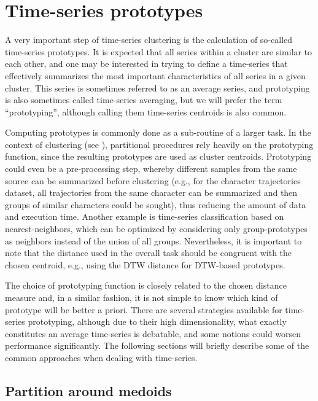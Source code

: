 \section{Time-series prototypes}
\label{sec:prototypes}

A very important step of time-series clustering is the calculation of so-called time-series prototypes.
It is expected that all series within a cluster are similar to each other,
and one may be interested in trying to define a time-series that effectively summarizes the most important characteristics of all series in a given cluster.
This series is sometimes referred to as an average series,
and prototyping is also sometimes called time-series averaging,
but we will prefer the term ``prototyping'',
although calling them time-series centroids is also common.

Computing prototypes is commonly done as a sub-routine of a larger task.
In the context of clustering (see ),
partitional procedures rely heavily on the prototyping function,
since the resulting prototypes are used as cluster centroids.
Prototyping could even be a pre-processing step,
whereby different samples from the same source can be summarized before clustering
(e.g., for the character trajectories dataset,
all trajectories from the same character can be summarized and then groups of similar characters could be sought),
thus reducing the amount of data and execution time.
Another example is time-series classification based on nearest-neighbors,
which can be optimized by considering only group-prototypes as neighbors instead of the union of all groups.
Nevertheless, it is important to note that the distance used in the overall task should be congruent with the chosen centroid,
e.g., using the DTW distance for DTW-based prototypes.

The choice of prototyping function is closely related to the chosen distance measure and,
in a similar fashion,
it is not simple to know which kind of prototype will be better a priori.
There are several strategies available for time-series prototyping,
although due to their high dimensionality,
what exactly constitutes an average time-series is debatable,
and some notions could worsen performance significantly.
The following sections will briefly describe some of the common approaches when dealing with time-series.

\subsection{Partition around medoids}
\label{sec:pam}

